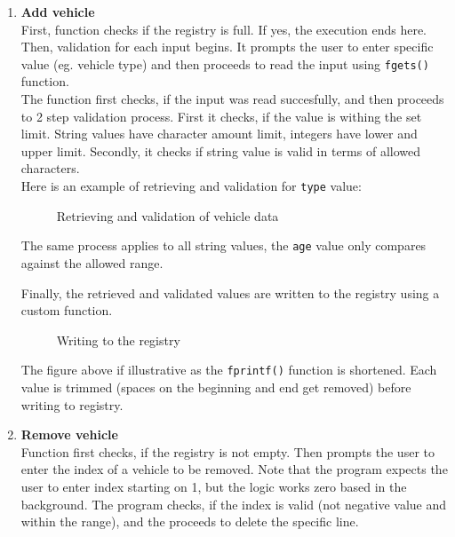 \documentclass[12pt, a4paper, openright]{article}
\begin{document}
\begin{enumerate}
  \item \textbf{Add vehicle} \\

  First, function checks if the registry is full. If yes, the execution ends here. Then, validation for each input begins. It prompts the user to enter specific value (eg. vehicle type) and then proceeds to read the input using \texttt{fgets()} function. \\

  The function first checks, if the input was read succesfully, and then proceeds to 2 step validation process. First it checks, if the value is withing the set limit. String values have character amount limit, integers have lower and upper limit. Secondly, it checks if string value is valid in terms of allowed characters. \\

  Here is an example of retrieving and validation for \texttt{type} value:
    
    \begin{figure}[h!]
        \centering
        \caption{Retrieving and validation of vehicle data}
        \label{fig:placeholder}
    \end{figure}
  
  The same process applies to all string values, the \texttt{age} value only compares against the allowed range.

  Finally, the retrieved and validated values are written to the registry using a custom function. 

    \begin{figure}[h!]
        \centering
        \caption{Writing to the registry}
        \label{fig:placeholder}
    \end{figure}

  The figure above if illustrative as the \texttt{fprintf()} function is shortened. Each value is trimmed (spaces on the beginning and end get removed) before writing to registry.

  \item \textbf{Remove vehicle} \\
  Function first checks, if the registry is not empty. Then prompts the user to enter the index of a vehicle to be removed. Note that the program expects the user to enter index starting on 1, but the logic works zero based in the background. The program checks, if the index is valid (not negative value and within the range), and the proceeds to delete the specific line.


\end{enumerate}
\end{document}
